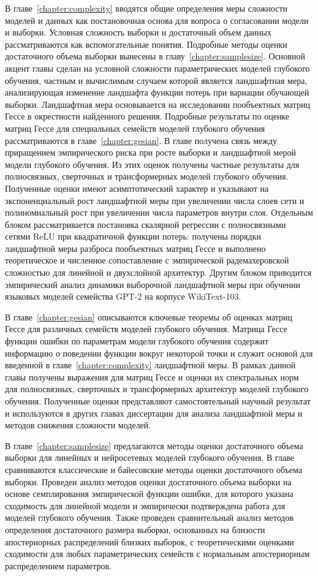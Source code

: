 В главе~\ref{chapter:complexity} вводятся общие определения меры сложности моделей и данных как постановочная основа для вопроса о согласовании модели и выборки.
Условная сложность выборки и достаточный объем данных рассматриваются как вспомогательные понятия. Подробные методы оценки достаточного объема выборки вынесены в главу~\ref{chapter:samplesize}.
Основной акцент главы сделан на условной сложности параметрических моделей глубокого обучения, частным и вычислимым случаем которой является ландшафтная мера, анализирующая изменение ландшафта функции потерь при вариации обучающей выборки.
Ландшафтная мера основывается на исследовании пообъектных матриц Гессе в окрестности найденного решения. Подробные результаты по оценке матриц Гессе для специальных семейств моделей глубокого обучения рассматриваются в главе~\ref{chapter:gesian}.
В главе получена связь между приращением эмпирического риска при росте выборки и ландшафтной мерой модели глубокого обучения.
Из этих оценок получены частные результаты для полносвязных, сверточных и трансформерных моделей глубокого обучения.
Полученные оценки имеют асимптотический характер и указывают на экспоненциальный рост ландшафтной меры при увеличении числа слоев сети и полиномиальный рост при увеличении числа параметров внутри слоя.
Отдельным блоком рассматривается постановка скалярной регрессии с полносвязными сетями ReLU при квадратичной функции потерь: получены порядки ландшафтной меры разброса пообъектных матриц Гессе и выполнено теоретическое и численное сопоставление с эмпирической радемахеровской сложностью для линейной и двухслойной архитектур.
Другим блоком приводится эмпирический анализ динамики выборочной ландшафтной меры при обучении языковых моделей семейства GPT-2 на корпусе WikiText-103.

В главе~\ref{chapter:gesian} описываются ключевые теоремы об оценках матриц Гессе для различных семейств моделей глубокого обучения.
Матрица Гессе функции ошибки по параметрам модели глубокого обучения содержит информацию о поведении функции вокруг некоторой точки и служит основой для введенной в главе~\ref{chapter:complexity} ландшафтной меры.
В рамках данной главы получены выражения для матриц Гессе и оценки их спектральных норм для полносвязных, сверточных и трансформерных архитектур моделей глубокого обучения.
Полученные оценки представляют самостоятельный научный результат и используются в других главах диссертации для анализа ландшафтной меры и методов снижения сложности моделей.

В главе~\ref{chapter:samplesize} предлагаются методы оценки достаточного объема выборки для линейных и нейросетевых моделей глубокого обучения.
В главе сравниваются классические и байесовские методы оценки достаточного объема выборки.
Проведен анализ методов оценки достаточного объема выборки на основе семплирования эмпирической функции ошибки, для которого указана сходимость для линейной модели и эмпирически подтверждена работа для моделей глубокого обучения.
Также проведен сравнительный анализ методов определения достаточного размера выборки, основанных на близости апостериорных распределений близких выборок, с теоретическими оценками сходимости для любых параметрических семейств с нормальным апостериорным распределением параметров.

